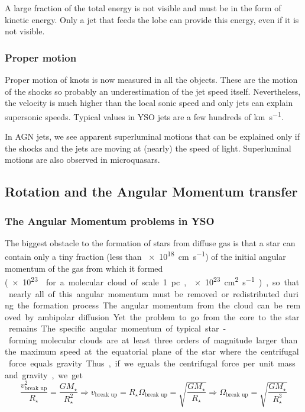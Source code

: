 \documentclass[10pt,a4paper,english,draft]{article}
\begin{document}
A large fraction of the total energy is not visible and must be in the form of kinetic energy. Only a jet that feeds the lobe can provide this energy, even if it is not visible.
\subsubsection{Proper motion}
Proper motion of knots is now measured in all the objects. These are the motion of the shocks so probably an underestimation of the jet speed itself. Nevertheless, the velocity is much higher than the local sonic speed and only jets can explain supersonic speeds. Typical values in YSO jets are a few hundreds of \si{\km\per\s}.


In AGN jets, we see apparent superluminal motions that can be explained only if the shocks and the jets are moving at (nearly) the speed of light. Superluminal motions are also observed in microquasars.
\subsection{Rotation and the Angular Momentum transfer}
\subsubsection{The Angular Momentum problems in YSO}
The biggest obstacle to the formation of stars from diffuse gas is that a star can contain only a tiny fraction (less than \SI{e18}{\cm\per\s}) of the initial angular momentum of the gas from which it formed (\SI{e23}{\cm\square\per\s} for a molecular cloud of scale \SI{1}{pc}, \SI{e23}{\cm\squared\per\s}), so that nearly all of this angular momentum must be removed or redistributed during the formation process. The angular momentum from the cloud can be removed by ambipolar diffusion. Yet the problem to go from the core to the star remains.

The specific angular momentum of typical star-forming molecular clouds are at least three orders of magnitude larger than the maximum speed at the equatorial plane of the star where the centrifugal force equals gravity. Thus, if we eguals the centrifugal force per unit mass and gravity, we get
\begin{equation}
  \frac{v^2_\textrm{break up}}{R_\star} = \frac{GM_\star}{R_\star^2}
  \Rightarrow v_\textrm{break up} = R_\star \Omega_\textrm{break up} = \sqrt{\frac{GM_\star}{R_\star}}
  \Rightarrow \Omega_\textrm{break up} = \sqrt{\frac{GM_\star}{R_\star^3}}
\end{equation}
\end{document}
